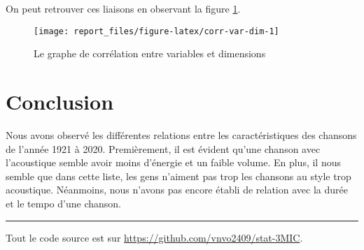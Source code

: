 \documentclass[
  11pt,
  xcolor = usenames,dvipsnames]{article}
\begin{document}
On peut retrouver ces liaisons en observant la figure \ref{fig:corr-var-dim}.

\begin{figure}

{\centering \texttt{[image: report\_files/figure-latex/corr-var-dim-1]} 

}

\caption{Le graphe de corrélation entre variables et dimensions}\label{fig:corr-var-dim}
\end{figure}

\hypertarget{conclusion}{%
\section{Conclusion}\label{conclusion}}

Nous avons observé les différentes relations entre les caractéristiques des chansons de l'année 1921 à 2020.
Premièrement, il est évident qu'une chanson avec l'acoustique semble avoir moins d'énergie et un faible volume.
En plus, il nous semble que dans cette liste, les gens n'aiment pas trop les chansons au style trop acoustique.
Néanmoins, nous n'avons pas encore établi de relation avec la durée et le tempo d'une chanson.

\begin{center}\rule{0.5\linewidth}{0.5pt}\end{center}

Tout le code source est sur \url{https://github.com/vnvo2409/stat-3MIC}.
\end{document}

